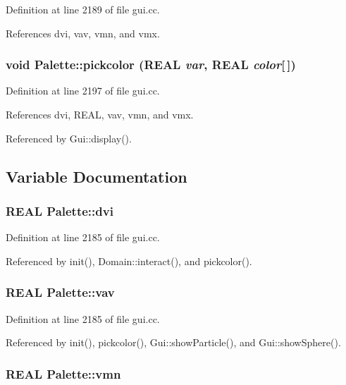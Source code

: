 Definition at line 2189 of file gui.cc.

References dvi, vav, vmn, and vmx.\hypertarget{namespacePalette_f84836ad8d13add0db8b82462a42dd39}{
\subsubsection[{pickcolor}]{\setlength{\rightskip}{0pt plus 5cm}void Palette::pickcolor (REAL {\em var}, \/  REAL {\em color}\mbox{[}$\,$\mbox{]})}}
\label{namespacePalette_f84836ad8d13add0db8b82462a42dd39}




Definition at line 2197 of file gui.cc.

References dvi, REAL, vav, vmn, and vmx.

Referenced by Gui::display().

\subsection{Variable Documentation}
\hypertarget{namespacePalette_f145e3cb0ec135556136cb35b433ce9a}{
\subsubsection[{dvi}]{\setlength{\rightskip}{0pt plus 5cm}REAL {\bf Palette::dvi}}}
\label{namespacePalette_f145e3cb0ec135556136cb35b433ce9a}




Definition at line 2185 of file gui.cc.

Referenced by init(), Domain::interact(), and pickcolor().\hypertarget{namespacePalette_1e3ee247e7f094dd9c9ddbe9acbf1390}{
\subsubsection[{vav}]{\setlength{\rightskip}{0pt plus 5cm}REAL {\bf Palette::vav}}}
\label{namespacePalette_1e3ee247e7f094dd9c9ddbe9acbf1390}




Definition at line 2185 of file gui.cc.

Referenced by init(), pickcolor(), Gui::showParticle(), and Gui::showSphere().\hypertarget{namespacePalette_17b5ab8ecd6038051c67291fb1428fdb}{
\subsubsection[{vmn}]{\setlength{\rightskip}{0pt plus 5cm}REAL {\bf Palette::vmn}}}
\label{namespacePalette_17b5ab8ecd6038051c67291fb1428fdb}




